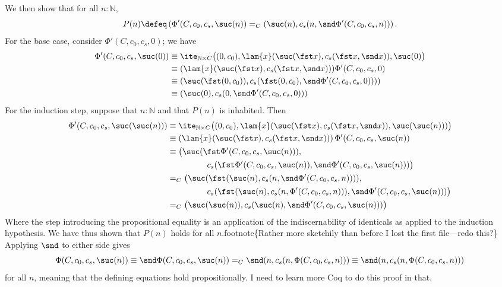 \noindent
We then show that for all $n : \mathbb{N}$,
\[
P(n) \defeq
\left(\Phi'(C, c_{0}, c_{s}, \suc(n)) 
=_{C}
(\suc(n), c_{s}(n, \snd \Phi'(C, c_{0}, c_{s}, n))
\right).
\]
For the base case, consider $\Phi'(C, c_{0}, c_{s}, 0)$; we have
 \begin{align*}
\Phi'(C, c_{0}, c_{s}, \suc(0))
&\equiv 
\ite_{\mathbb{N} \times C}\big(
(0, c_{0}),
\lam{x}(\suc(\fst x), c_{s}(\fst x, \snd x)),
\suc(0)
\big)
\\&\equiv 
(\lam{x}(\suc(\fst x), c_{s}(\fst x, \snd x)))
\Phi'(C, c_{0}, c_{s}, 0)
\\&\equiv 
(\suc(\fst (0, c_{0})), c_{s}(\fst (0, c_{0}), \snd \Phi'(C, c_{0}, c_{s}, 0))))
\\&\equiv 
\left(\suc(0), c_{s}(0, \snd \Phi'(C, c_{0}, c_{s}, 0))\right)
\end{align*} 
For the induction step, suppose that $n : \mathbb{N}$ and that $P(n)$ is
inhabited.  Then
\begin{align*}
\Phi'(C, c_{0}, c_{s}, \suc(\suc(n)))
&\equiv
\ite_{\mathbb{N} \times C}\big(
(0, c_{0}),
\lam{x}(\suc(\fst x), c_{s}(\fst x, \snd x)),
\suc(\suc(n)))
\big)
\\&\equiv
\left(\lam{x}(\suc(\fst x), c_{s}(\fst x, \snd x))\right)
\Phi'(C, c_{0}, c_{s}, \suc(n))
\\&\equiv
\big(\suc(\fst \Phi'(C, c_{0}, c_{s}, \suc(n))), 
\\&\phantom{-----}
c_{s}(\fst \Phi'(C, c_{0}, c_{s}, \suc(n)), \snd \Phi'(C, c_{0},
c_{s}, \suc(n)))\big)
\\&=_{C}
\big(\suc(\fst (\suc(n), c_{s}(n, \snd \Phi'(C, c_{0}, c_{s}, n)))), 
\\&\phantom{-----}
c_{s}(\fst (\suc(n), c_{s}(n, \Phi'(C, c_{0}, c_{s}, n))), \snd \Phi'(C, c_{0},
c_{s}, \suc(n)))\big)
\\&=_{C}
\big(\suc(\suc(n)), 
c_{s}(\suc(n), \snd \Phi'(C, c_{0}, c_{s}, \suc(n)))\big)
\end{align*} 
Where the step introducing the propositional equality is an application of the
indiscernability of identicals as applied to the induction hypothesis.  We have
thus shown that $P(n)$ holds for all $n$.footnote\{Rather more sketchily than
before I lost the first file---redo this?\}  Applying $\snd$ to either side
gives
\[
  \Phi(C, c_{0}, c_{s}, \suc(n))
  \equiv
  \snd\Phi(C, c_{0}, c_{s}, \suc(n))
  =_{C}
  \snd(n, c_{s}(n, \Phi(C, c_{0}, c_{s}, n)))
  \equiv
  \snd(n, c_{s}(n, \Phi(C, c_{0}, c_{s}, n)))
\]
for all $n$, meaning that the defining equations hold propositionally.  I need
to learn more Coq to do this proof in that.




